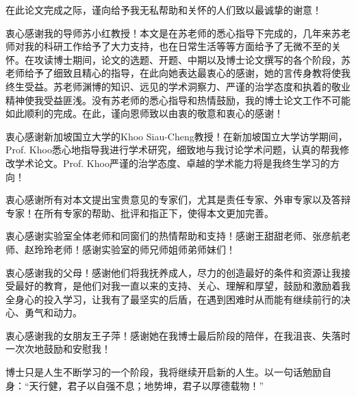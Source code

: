 

在此论文完成之际，谨向给予我无私帮助和关怀的人们致以最诚挚的谢意！

衷心感谢我的导师苏小红教授！本文是在苏老师的悉心指导下完成的，几年来苏老师对我的科研工作给予了大力支持，也在日常生活等等方面给予了无微不至的关怀。在攻读博士期间，论文的选题、开题、中期以及博士论文撰写的各个阶段，苏老师给予了细致且精心的指导，在此向她表达最衷心的感谢，她的言传身教将使我终生受益。苏老师渊博的知识、远见的学术洞察力、严谨的治学态度和执着的敬业精神使我受益匪浅。没有苏老师的悉心指导和热情鼓励，我的博士论文工作不可能如此顺利的完成。在此，谨向恩师致以由衷的敬意和衷心的感谢！

衷心感谢新加坡国立大学的Khoo Siau-Cheng教授！在新加坡国立大学访学期间，Prof. Khoo悉心地指导我进行学术研究，细致地与我讨论学术问题，认真的帮我修改学术论文。Prof. Khoo严谨的治学态度、卓越的学术能力将是我终生学习的方向！

衷心感谢所有对本文提出宝贵意见的专家们，尤其是责任专家、外审专家以及答辩专家！在所有专家的帮助、批评和指正下，使得本文更加完善。

衷心感谢实验室全体老师和同窗们的热情帮助和支持！感谢王甜甜老师、张彦航老师、赵玲玲老师！感谢实验室的师兄师姐师弟师妹们！

衷心感谢我的父母！感谢他们将我抚养成人，尽力的创造最好的条件和资源让我接受最好的教育，是他们对我一直以来的支持、关心、理解和厚望，鼓励和激励着我全身心的投入学习，让我有了最坚实的后盾，在遇到困难时从而能有继续前行的决心、勇气和动力。

衷心感谢我的女朋友王子萍！感谢她在我博士最后阶段的陪伴，在我沮丧、失落时一次次地鼓励和安慰我！

博士只是人生不断学习的一个阶段，我将继续开启新的人生。以一句话勉励自身：“天行健，君子以自强不息；地势坤，君子以厚德载物！”
